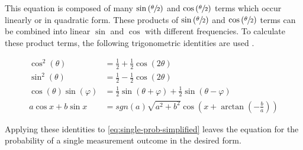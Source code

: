 This equation is composed of many $\sin\left(\sfrac\theta2\right)$ and
$\cos\left(\sfrac\theta2\right)$ terms which occur linearly or in quadratic
form.
These products of $\sin\left(\sfrac\theta2\right)$ and
$\cos\left(\sfrac\theta2\right)$ terms can be combined into linear $\sin$ and
$\cos$ with different frequencies.
To calculate these product terms, the following trigonometric identities are
used \cite{bronstejn_taschenbuch_2016}.

\begin{subequations}
    \label{eq:trigonometric-identities}
    \begin{align}
        \cos^2\left(\theta\right)
            &= \frac12 + \frac12 \cos\left(2\theta\right)
            \label{eq:cos-squared} \\
        \sin^2\left(\theta\right)
            &= \frac12 - \frac12 \cos\left(2\theta\right)
            \label{eq:sin-squared} \\
        \cos\left(\theta\right)\sin\left(\varphi\right)
            &= \frac12\sin\left(\theta + \varphi\right) + \frac12 \sin\left(\theta - \varphi\right)
            \label{eq:cos-sin} \\
        a\cos x + b \sin x
            &= sgn(a) \sqrt{a^2 + b^2} \cos\left(x + \arctan\left(-\frac ba\right)\right)
            \label{eq:cos-sum}
    \end{align}
\end{subequations}

Applying these identities to \autoref{eq:single-prob-simplified} leaves the
equation for the probability of a single measurement outcome in the desired
form.


